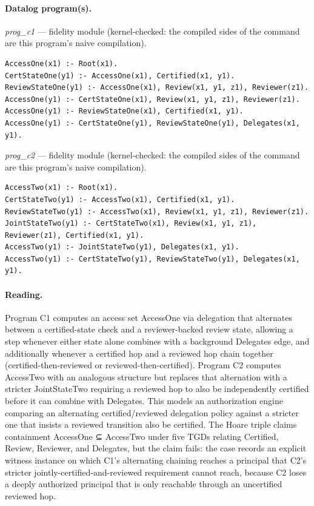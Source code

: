 \documentclass[10pt]{article}
\begin{document}
\paragraph{Datalog program(s).}

{\raggedright\textit{prog\_c1} --- fidelity module (kernel-checked: the compiled sides of the command are this program's naive compilation).\par}

\begin{Verbatim}[fontsize=\scriptsize,breaklines=true,breakanywhere=true,frame=single,framesep=1.5mm]
AccessOne(x1) :- Root(x1).
CertStateOne(y1) :- AccessOne(x1), Certified(x1, y1).
ReviewStateOne(y1) :- AccessOne(x1), Review(x1, y1, z1), Reviewer(z1).
AccessOne(y1) :- CertStateOne(x1), Review(x1, y1, z1), Reviewer(z1).
AccessOne(y1) :- ReviewStateOne(x1), Certified(x1, y1).
AccessOne(y1) :- CertStateOne(y1), ReviewStateOne(y1), Delegates(x1, y1).
\end{Verbatim}

{\raggedright\textit{prog\_c2} --- fidelity module (kernel-checked: the compiled sides of the command are this program's naive compilation).\par}

\begin{Verbatim}[fontsize=\scriptsize,breaklines=true,breakanywhere=true,frame=single,framesep=1.5mm]
AccessTwo(x1) :- Root(x1).
CertStateTwo(y1) :- AccessTwo(x1), Certified(x1, y1).
ReviewStateTwo(y1) :- AccessTwo(x1), Review(x1, y1, z1), Reviewer(z1).
JointStateTwo(y1) :- CertStateTwo(x1), Review(x1, y1, z1), Reviewer(z1), Certified(x1, y1).
AccessTwo(y1) :- JointStateTwo(y1), Delegates(x1, y1).
AccessTwo(y1) :- CertStateTwo(y1), ReviewStateTwo(y1), Delegates(x1, y1).
\end{Verbatim}

\paragraph{Reading.} Program C1 computes an access set AccessOne via delegation that alternates between a certified-state check and a reviewer-backed review state, allowing a step whenever either state alone combines with a background Delegates edge, and additionally whenever a certified hop and a reviewed hop chain together (certified-then-reviewed or reviewed-then-certified). Program C2 computes AccessTwo with an analogous structure but replaces that alternation with a stricter JointStateTwo requiring a reviewed hop to also be independently certified before it can combine with Delegates. This models an authorization engine comparing an alternating certified/reviewed delegation policy against a stricter one that insists a reviewed transition also be certified. The Hoare triple claims containment AccessOne ⊆ AccessTwo under five TGDs relating Certified, Review, Reviewer, and Delegates, but the claim fails: the case records an explicit witness instance on which C1's alternating chaining reaches a principal that C2's stricter jointly-certified-and-reviewed requirement cannot reach, because C2 loses a deeply authorized principal that is only reachable through an uncertified reviewed hop.
\end{document}
